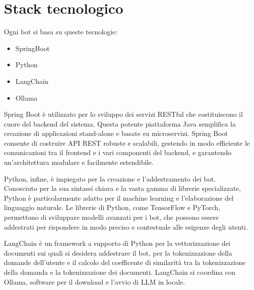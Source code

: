 \documentclass[a4paper,twoside,12pt]{toptesi}
\begin{document}
\section{Stack tecnologico}

Ogni bot si basa su queste tecnologie:

\begin{itemize}
	\item SpringBoot
	\item Python
	\item LangChain
	\item Ollama
\end{itemize} 

Spring Boot è utilizzato per lo sviluppo dei servizi RESTful che costituiscono il cuore del backend del sistema. Questa potente piattaforma Java semplifica la creazione di applicazioni stand-alone e basate su microservizi. Spring Boot consente di costruire API REST robuste e scalabili, gestendo in modo efficiente le comunicazioni tra il frontend e i vari componenti del backend, e garantendo un'architettura modulare e facilmente estendibile.

Python, infine, è impiegato per la creazione e l'addestramento dei bot. Conosciuto per la sua sintassi chiara e la vasta gamma di librerie specializzate, Python è particolarmente adatto per il machine learning e l'elaborazione del linguaggio naturale. Le librerie di Python, come TensorFlow e PyTorch, permettono di sviluppare modelli avanzati per i bot, che possono essere addestrati per rispondere in modo preciso e contestuale alle esigenze degli utenti.

LangChain è un framework a supporto di Python per la vettorizzazione dei documenti sui quali si desidera addestrare il bot, per la tokenizzazione della domande dell'utente e il calcolo del coefficente di similarità tra la tokenizzazione della domanda e la tokenizzazione dei documenti. LangChain si coordina con Ollama, software per il download e l'avvio di LLM in locale.
\end{document}
